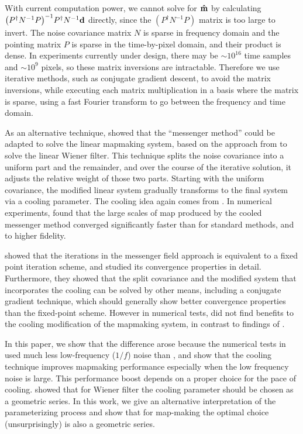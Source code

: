\documentclass[twocolumn,linenumbers]{aastex631}
\newcommand{\vbd}{\vb{d}}
\newcommand{\inv}[1]{#1^{-1}}
\newcommand{\hatm}{\vb{\hat{m}}}
\newcommand{\Pdagger}{P^{\dagger}}
\newcommand{\PPinv}[1]{\inv{\qty(\Pdagger #1 P)}}
\begin{document}
With current computation power, we cannot solve for $\hatm$
by calculating $\PPinv{\inv{N}} \Pdagger \inv{N} \vbd$ directly, since the $(P^\dag \inv{N}P)$ matrix is too large to invert.  The noise covariance matrix $N$ is sparse in frequency domain and the pointing matrix $P$ is sparse in the time-by-pixel domain, and their product is dense.   In experiments currently under design, there may be $\sim 10^{16}$ time samples and $\sim 10^{9}$ pixels, so these matrix inversions are intractable.
Therefore we use iterative methods, such as conjugate gradient descent, to avoid the matrix inversions, while executing each matrix multiplication in a basis where the matrix is sparse, using a fast Fourier transform to go between the frequency and time domain.

As an alternative technique, \citet{Huffenberger_2018} showed that the ``messenger method'' could be adapted to solve the linear mapmaking system, based on the  approach from \cite{2013A&A...549A.111E} to solve the linear Wiener filter.  This technique splits the noise covariance into a uniform part and the remainder, and over the course of the iterative solution, it adjusts the relative weight of those two parts.  Starting with the uniform covariance, the modified linear system gradually transforms to the final system via a cooling parameter.  The cooling idea again comes from \cite{2013A&A...549A.111E}.  In numerical experiments, \citet{Huffenberger_2018} found that the large scales of map produced by the cooled messenger method converged significantly faster than for standard methods, and to higher fidelity.  

\citet{2018A&A...620A..59P} showed that the iterations in the messenger field approach is equivalent to a fixed point iteration scheme, and studied its convergence properties in detail.  Furthermore, they showed that the split covariance and the modified system that incorporates the cooling can be solved by other means, including a conjugate gradient technique, which should generally show better convergence properties than the fixed-point scheme. However in numerical tests, \citet{2018A&A...620A..59P} did not find benefits to the cooling modification of the mapmaking system, in contrast to findings of \citet{Huffenberger_2018}.

In this paper, we show that the difference arose because the numerical tests in \citet{2018A&A...620A..59P} used much less low-frequency ($1/f$) noise than \citet{Huffenberger_2018}, and show that the cooling technique improves mapmaking performance especially when the low frequency noise is large.  This performance boost depends on a proper choice for the pace of cooling.  \citet{2017MNRAS.468.1782K} showed that for Wiener filter the cooling parameter should be chosen as a geometric series.  In this work, we give an alternative interpretation of the parameterizing process and show that for map-making the optimal choice (unsurprisingly) is also a geometric series.
\end{document}
